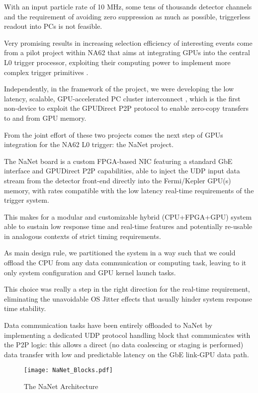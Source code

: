 With an input particle rate of 10 MHz, some tens of thousands detector
channels and the requirement of avoiding zero suppression as much as
possible, triggerless readout into PCs is not feasible.

Very promising results in increasing selection efficiency of
interesting events come from a pilot project within NA62 that aims at
integrating GPUs into the central L0 trigger processor, exploiting
their computing power to implement more complex trigger primitives
\cite{2012NIMPA.662...49C}.

Independently, in the framework of the \euretile project, we were
developing the low latency, scalable, GPU-accelerated PC cluster
interconnect \apenetp, which is the first non-\nvidia device to 
exploit the \nvidia GPUDirect P2P protocol to enable zero-copy 
transfers to and from GPU memory.

From the joint effort of these two projects comes the next step of
GPUs integration for the NA62 L0 trigger: the NaNet project.

The NaNet board is a custom FPGA-based NIC featuring a standard GbE
interface and GPUDirect P2P capabilities, able to inject the UDP input
data stream from the detector front-end directly into the Fermi/Kepler
GPU(s) memory, with rates compatible with the low latency real-time
requirements of the trigger system.

This makes for a modular and customizable hybrid (CPU+FPGA+GPU) system
able to sustain low response time and real-time features and
potentially re-usable in analogous contexts of strict timing
requirements.

As main design rule, we partitioned the system in a way such that we
could offload the CPU from any data communication or computing task,
leaving to it only system configuration and GPU kernel launch tasks.

This choice was really a step in the right direction for the real-time
requirement, eliminating the unavoidable OS Jitter effects that
usually hinder system response time stability.

Data communication tasks have been entirely offloaded to NaNet by
implementing a dedicated UDP protocol handling block that communicates
with the P2P logic: this allows a direct (no data coalescing or
staging is performed) data transfer with low and predictable latency
on the GbE link-GPU data path.

\begin{figure}[!htb]
  \centering
  \texttt{[image: NaNet\_Blocks.pdf]}
  \caption{The NaNet Architecture}
  \label{fig:NaNet}
\end{figure}

